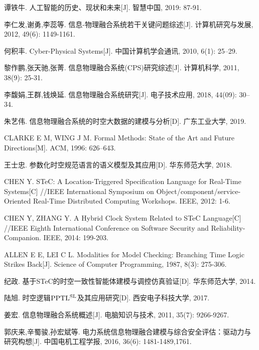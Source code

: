 
\begin{thebibliography}{2}
\setlength{\baselineskip}{25pt}

谭铁牛. 人工智能的历史、现状和未来[J]. 智慧中国, 2019: 87-91.

李仁发,谢勇,李蕊等. 信息$\!$-物理融合系统若干关键问题综述[J]. 计算机研究与发展, 2012, 49(6): 1149-1161.

何积丰. Cyber-Physical Systems[J]. 中国计算机学会通讯, 2010, 6(1): 25–29.

黎作鹏,张天驰,张菁. 信息物理融合系统(CPS)研究综述[J]. 计算机科学, 2011, 38(9): 25-31.

李馥娟,王群,钱焕延. 信息物理融合系统研究[J]. 电子技术应用, 2018, 44(09): 30–34.

朱艺伟. 信息物理融合系统的时空大数据的建模与分析[D]. 广东工业大学, 2019. 

CLARKE E M, WING J M. Formal Methods: State of the Art and Future Directions[M]. ACM, 1996: 626–643.

王士忠. 参数化时空规范语言的语义模型及其应用[D]. 华东师范大学, 2018.

CHEN Y. STeC: A Location-Triggered Specification Language for Real-Time Systems[C] //IEEE International Symposium on Object/component/service-Oriented Real-Time Distributed Computing Workshops. IEEE, 2012: 1-6.

CHEN Y, ZHANG Y. A Hybrid Clock System Related to STeC Language[C] //IEEE Eighth International Conference on Software Security and Reliability-Companion. IEEE, 2014: 199-203.

ALLEN E E, LEI C L. Modalities for Model Checking: Branching Time Logic Strikes Back[J]. Science of Computer Programming, 1987, 8(3): 275-306. 

纪政. 基于STeC的时空一致性智能体建模与调控仿真验证[D]. 华东师范大学, 2014.

陆旭. 时空逻辑$\rm PPTL^{\rm SL}$及其应用研究[D]. 西安电子科技大学, 2017.

姜宏. 信息物理融合系统概述[J]. 电脑知识与技术, 2011, 35(7): 9266-9267.

郭庆来,辛蜀骏,孙宏斌等. 电力系统信息物理融合建模与综合安全评估：驱动力与研究构想[J]. 中国电机工程学报, 2016, 36(6): 1481-1489,1761.


\end{thebibliography}
